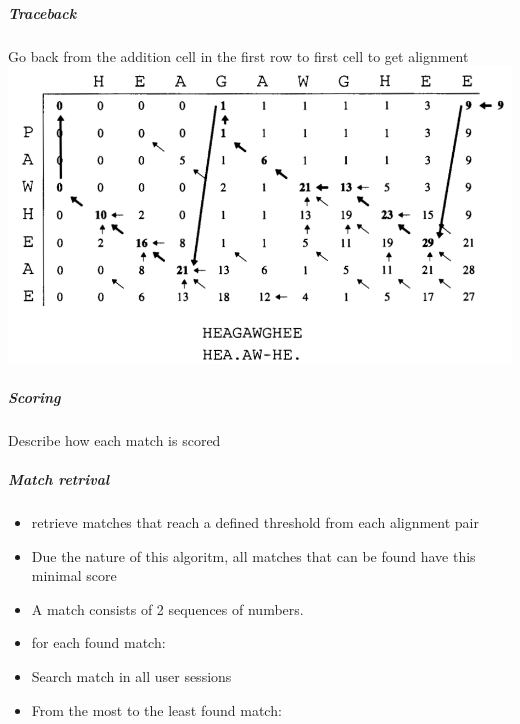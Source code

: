 \subparagraph{Traceback}
Go back from the addition cell in the first row to first cell to get alignment
\includegraphics[width=\textwidth]{chapters/approach/smithwatermanrepeated.png}

\subparagraph{Scoring}
Describe how each match is scored

\subparagraph{Match retrival}
	\begin{itemize}
		\item retrieve matches that reach a defined threshold from each alignment pair
		\item Due the nature of this algoritm, all matches that can be found have this minimal score
		\item A match consists of 2 sequences of numbers. 
		\item for each found match:
		\item Search match in all user sessions
		\item From the most to the least found match:
	\end{itemize}
